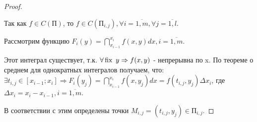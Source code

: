 \begin{proof}
\begin{center}
	\end{center}

	Так как $f \in C(\text{П}) $, то $ f \in C(\text{П}_{i,j}), \forall i = \overline{1,m}, \forall j = \overline{1,l}$.

	Рассмотрим функцию $F_i(y) = \dint\limits_{x_{i-1}}^{x_i} f(x,y)dx, i = \overline{1,m}$.

    Этот интеграл существует, т.к. $\forall \operatorname{\text{fix }} y \Rightarrow f(x,y)$ - непрерывна по x. По теореме о среднем для однократных интегралов получаем, что:\\
	$\exists t_{i,j} \in [x_{i-1}; x_i] \Rightarrow F_i(y_j) = \dint\limits_{x_{i-1}}^{x_i} f(x,y_j)dx = f(t_{i,j}, y_j) \Delta x_i$, где $\Delta x_i = x_i - x_{i-1}, i = \overline{1,m}$.

	В соответствии с этим определены точки $M_{i,j} = (t_{i,j}, y_j) \in \text{П}_{i,j}$.


\end{proof}
